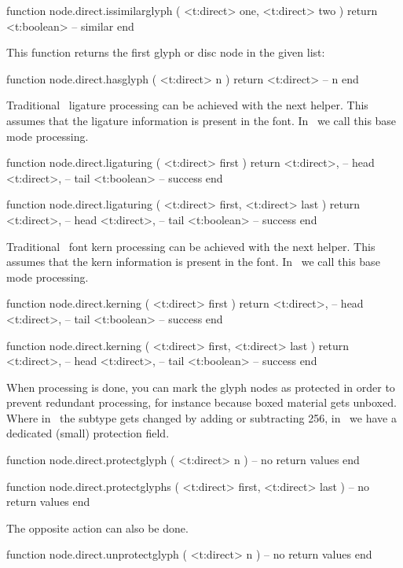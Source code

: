 \starttyping[option=LUA]
function node.direct.issimilarglyph ( <t:direct>  one, <t:direct> two )
    return <t:boolean> -- similar
end
\stoptyping

This function returns the first glyph or disc node in the given list:

\starttyping[option=LUA]
function node.direct.hasglyph ( <t:direct> n )
    return <t:direct> -- n
end
\stoptyping

Traditional \TEX\ ligature processing can be achieved with the next helper. This
assumes that the ligature information is present in the font. In \CONTEXT\ we
call this base mode processing.

\starttyping[option=LUA]
function node.direct.ligaturing ( <t:direct> first )
    return
        <t:direct>, -- head
        <t:direct>, -- tail
        <t:boolean> -- success
end

function node.direct.ligaturing ( <t:direct> first, <t:direct> last )
    return
        <t:direct>, -- head
        <t:direct>, -- tail
        <t:boolean> -- success
end
\stoptyping

Traditional \TEX\ font kern processing can be achieved with the next helper. This
assumes that the kern information is present in the font. In \CONTEXT\ we
call this base mode processing.

\starttyping[option=LUA]
function node.direct.kerning ( <t:direct> first )
    return
        <t:direct>, -- head
        <t:direct>, -- tail
        <t:boolean> -- success
end

function node.direct.kerning ( <t:direct> first, <t:direct> last )
    return
        <t:direct>, -- head
        <t:direct>, -- tail
        <t:boolean> -- success
end
\stoptyping

When processing is done, you can mark the glyph nodes as protected in order to
prevent redundant processing, for instance because boxed material gets unboxed.
Where in \LUATEX\ the subtype gets changed by adding or subtracting 256, in
\LUAMETATEX\ we have a dedicated (small) protection field.

\starttyping[option=LUA]
function node.direct.protectglyph ( <t:direct> n )
    -- no return values
end

function node.direct.protectglyphs ( <t:direct> first, <t:direct> last )
    -- no return values
end
\stoptyping

The opposite action can also be done.

\starttyping[option=LUA]
function node.direct.unprotectglyph ( <t:direct> n )
    -- no return values
end

